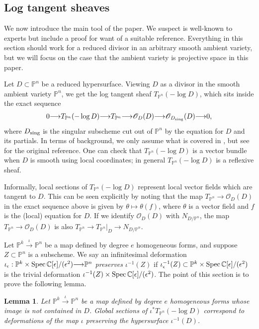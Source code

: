 \documentclass[11pt,reqno]{amsart}
\theoremstyle{plain}
\newtheorem{lemma}[theorem]{Lemma}
\theoremstyle{definition}
\theoremstyle{remark}
\numberwithin{equation}{section}
\newcommand{\cO}{{\mathscr O}}
\renewcommand{\to}{{\longrightarrow}}
\numberwithin{equation}{section}
\newcommand{\Spec}{{\text{\rm Spec}\,}}
\begin{document}
\subsection{Log tangent sheaves}
We now introduce the main tool of the paper. We suspect  is well-known to experts but include a proof for want of a suitable reference. Everything in this section should work for a reduced divisor in an arbitrary smooth ambient variety, but we will focus on the case that the ambient variety is projective space in this paper.

Let $D\subset \mathbb{P}^n$ be a reduced hypersurface. Viewing $D$ as a divisor in the smooth ambient variety $\mathbb{P}^n$, we get the log tangent sheaf $T_{\mathbb{P}^n}(-\log D)$, which sits inside the exact sequence
\begin{align*}
    0\to T_{\mathbb{P}^n}(-\log D)\to T_{\mathbb{P}^n}\to \mathscr{O}_D(D)\to \mathscr{O}_{D_{{\rm sing}}}(D)\to 0,
\end{align*}
where $D_{{\rm sing}}$ is the singular subscheme cut out of $\mathbb{P}^n$ by the equation for $D$ and its partials. In terms of background, we  only assume what is covered in \cite[2.1.2]{Xia93}, but see \cite{S80} for the original reference. One can check that $T_{\mathbb{P}^n}(-\log D)$ is a vector bundle when $D$ is smooth using local coordinates; in general $T_{\mathbb{P}^n}(-\log D)$ is a reflexive sheaf.

Informally, local sections of $T_{\mathbb{P}^n}(-\log D)$ represent local vector fields which are tangent to $D$. This can be seen explicitly by noting that the map $T_{\mathbb{P}^n}\to \cO_D(D)$ in the exact sequence above is given by $\theta\mapsto \theta(f)$, where $\theta$ is a vector field and $f$ is the (local) equation for $D$. If we identify $\cO_D(D)$ with $N_{D/\mathbb{P}^n}$, the map $T_{\mathbb{P}^n}\to \cO_D(D)$ is also $T_{\mathbb{P}^n}\to T_{\mathbb{P}^n}|_{D}\to N_{D/\mathbb{P}^n}$.

Let $\mathbb{P}^k\xrightarrow{\iota} \mathbb{P}^n$ be a map defined by degree $e$ homogeneous forms, and suppose $Z \subset \mathbb{P}^{n}$ is a subscheme.  We say an infinitesimal deformation $\iota_{\epsilon} : \mathbb{P}^{k}\times\Spec \mathbb{C}[\epsilon]/(\epsilon^{2}) \to \mathbb{P}^{n}$ {\sl preserves $\iota^{-1}(Z)$} if $\iota_{\epsilon}^{-1}(Z) \subset \mathbb{P}^{k}\times\Spec \mathbb{C}[\epsilon]/(\epsilon^{2})$ is the trivial deformation $\iota^{-1}(Z)\times \Spec \mathbb{C}[\epsilon]/(\epsilon^{2})$.
The point of this section is to prove the following lemma.
\begin{lemma}
\label{logtangent}
Let $\mathbb{P}^k\xrightarrow{\iota} \mathbb{P}^n$ be a map defined by degree $e$ homogeneous forms whose image is not contained in $D$. Global sections of $\iota^{*}T_{\mathbb{P}^n}(-\log D)$ correspond to deformations of the map $\iota$ preserving the hypersurface $\iota^{-1}(D)$.
\end{lemma}
\end{document}
